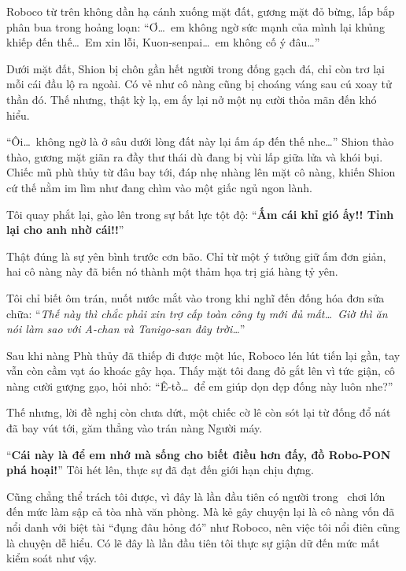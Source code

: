 \documentclass[../main.tex]{subfiles}
\begin{document}
Roboco từ trên không dần hạ cánh xuống mặt đất, gương mặt đỏ bừng, lắp bắp phân bua trong hoảng loạn: ``Ơ\dots\ em không ngờ sức mạnh của mình lại khủng khiếp đến thế\dots\ Em xin lỗi, Kuon-senpai\dots\ em không cố ý đâu\dots''

Dưới mặt đất, Shion bị chôn gần hết người trong đống gạch đá, chỉ còn trơ lại mỗi cái đầu lộ ra ngoài. Có vẻ như cô nàng cũng bị choáng váng sau cú xoay tử thần đó. Thế nhưng, thật kỳ lạ, em ấy lại nở một nụ cười thỏa mãn đến khó hiểu.


``Ôi\dots\ không ngờ là ở sâu dưới lòng đất này lại ấm áp đến thế nhe\dots'' Shion thào thào, gương mặt giãn ra đầy thư thái dù đang bị vùi lấp giữa lửa và khói bụi. Chiếc mũ phù thủy từ đâu bay tới, đáp nhẹ nhàng lên mặt cô nàng, khiến Shion cứ thế nằm im lìm như đang chìm vào một giấc ngủ ngon lành.

Tôi quay phắt lại, gào lên trong sự bất lực tột độ: ``\textbf{Ấm cái khỉ gió ấy!! Tỉnh lại cho anh nhờ cái!!}''

Thật đúng là sự yên bình trước cơn bão. Chỉ từ một ý tưởng giữ ấm đơn giản, hai cô nàng này đã biến nó thành một thảm họa trị giá hàng tỷ yên.

Tôi chỉ biết ôm trán, nuốt nước mắt vào trong khi nghĩ đến đống hóa đơn sửa chữa: ``\textit{Thế này thì chắc phải xin trợ cấp toàn công ty mới đủ mất\dots\ Giờ thì ăn nói làm sao với A-chan và Tanigo-san đây trời\dots}''

\omk

Sau khi nàng Phù thủy đã thiếp đi được một lúc, Roboco lén lút tiến lại gần, tay vẫn còn cầm vạt áo khoác gây họa. Thấy mặt tôi đang đỏ gắt lên vì tức giận, cô nàng cười gượng gạo, hỏi nhỏ: ``Ê-tồ\dots\ để em giúp dọn dẹp đống này luôn nhe?''

Thế nhưng, lời đề nghị còn chưa dứt, một chiếc cờ lê còn sót lại từ đống đổ nát đã bay vút tới, găm thẳng vào trán nàng Người máy.

``\textbf{Cái này là để em nhớ mà sống cho biết điều hơn đấy, đồ Robo-PON phá hoại!}'' Tôi hét lên, thực sự đã đạt đến giới hạn chịu đựng.

Cũng chẳng thể trách tôi được, vì đây là lần đầu tiên có người trong \hll\ chơi lớn đến mức làm sập cả tòa nhà văn phòng. Mà kẻ gây chuyện lại là cô nàng vốn đã nổi danh với biệt tài ``đụng đâu hỏng đó'' như Roboco, nên việc tôi nổi điên cũng là chuyện dễ hiểu. Có lẽ đây là lần đầu tiên tôi thực sự giận dữ đến mức mất kiểm soát như vậy.
\end{document}
